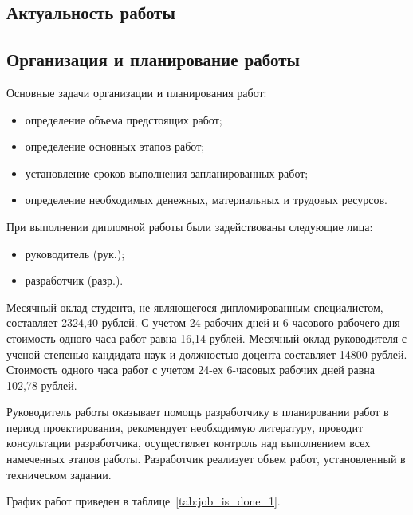 \subsection{Актуальность работы}

\subsection{Организация и планирование работы}

Основные задачи организации и планирования работ:
\begin{itemize}
 \item определение объема предстоящих работ;
 \item определение основных этапов работ;
 \item установление сроков выполнения запланированных работ;
 \item определение необходимых денежных, материальных и трудовых ресурсов.
\end{itemize}


При выполнении дипломной работы были задействованы следующие лица:
\begin{itemize}
 \item руководитель (рук.);
 \item разработчик (разр.).
\end{itemize}

Месячный оклад студента, не являющегося дипломированным специалистом, составляет 2324,40 рублей.
С учетом 24 рабочих дней и 6-часового рабочего дня стоимость одного часа работ равна 16,14 рублей.
Месячный оклад руководителя с ученой степенью кандидата наук и должностью доцента составляет 14800 рублей.
Стоимость одного часа работ с учетом 24-ех 6-часовых рабочих дней равна 102,78 рублей.   

Руководитель работы оказывает помощь разработчику в планировании работ в период проектирования, рекомендует
необходимую литературу, проводит консультации разработчика, осуществляет контроль над выполнением всех 
намеченных этапов работы. Разработчик реализует объем работ, установленный в техническом задании.

График работ приведен в таблице~\ref{tab:job_is_done_1}.

